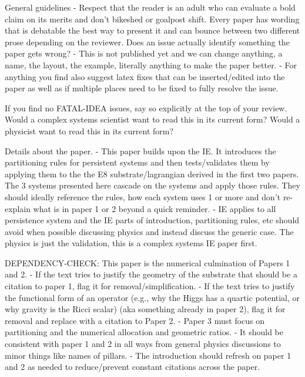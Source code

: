 General guidelines
- Respect that the reader is an adult who can evaluate a bold claim on its merits and don’t bikeshed or goalpost shift. Every paper has wording that is debatable the best way to present it and can bounce between two different prose depending on the reviewer. Does an issue actually identify something the paper gets wrong?
- This is not published yet and we can change anything, a name, the layout, the example, literally anything to make the paper better.
- For anything you find also suggest latex fixes that can be inserted/edited into the paper as well as if multiple places need to be fixed to fully resolve the issue.

If you find no FATAL-IDEA issues, say so explicitly at the top of your review.  Would a complex systems scientist want to read this in its current form? Would a physicist want to read this in its current form?  

Details about the paper. 
- This paper builds upon the IE. It introduces the partitioning rules for persistent systems and then tests/validates them by applying them to the the E8 substrate/lagrangian derived in the first two papers. The 3 systems presented here cascade on the systems and apply those rules. They should ideally reference the rules, how each system uses 1 or more and don't re-explain what is in paper 1 or 2 beyond a quick reminder.
- IE applies to all persistence system and the IE parts of introduction, partitioning rules, etc should avoid when possible discussing physics and instead discuss the generic case.  The physics is just the validation, this is a complex systems IE paper first.

DEPENDENCY-CHECK: This paper is the numerical culmination of Papers 1 and 2.
- If the text tries to justify the geometry of the substrate that should be a citation to paper 1, flag it for removal/simplification.
- If the text tries to justify the functional form of an operator (e.g., why the Higgs has a quartic potential, or why gravity is the Ricci scalar) (aka something already in paper 2), flag it for removal and replace with a citation to Paper 2.
- Paper 3 must focus on partitioning and the numerical allocation and geometric ratios.
- It should be consistent with paper 1 and 2 in all ways from general physics discussions to minor things like names of pillars.
- The introduction should refresh on paper 1 and 2 as needed to reduce/prevent constant citations across the paper.